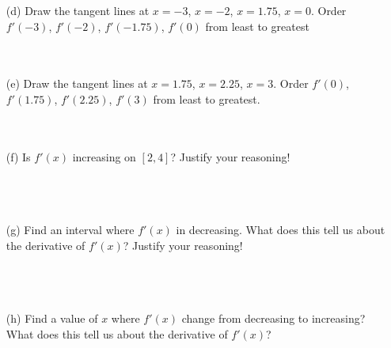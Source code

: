 \documentclass[12pt]{article}
\begin{document}
\begin{itemize}
\item[(d)] Draw the tangent lines at $x=-3$, $x=-2$, $x=1.75$, $x=0$. Order $f'(-3)$, $f'(-2)$, $f'(-1.75)$, $f'(0)$ from least to greatest\\\\\\
\item[(e)] Draw the tangent lines at $x=1.75$, $x=2.25$, $x=3$. Order $f'(0)$, $f'(1.75)$, $f'(2.25)$, $f'(3)$ from least to greatest.\\\\\\
\item[(f)] Is $f'(x)$ increasing on $[2,4]$? Justify your reasoning!\\\\\\\\
\item[(g)] Find an interval where $f'(x)$ in decreasing. What does this tell us about the derivative of $f'(x)$? Justify your reasoning!\\\\\\\\
\item[(h)] Find a value of $x$ where $f'(x)$ change from decreasing to increasing? What does this tell us about the derivative of $f'(x)$?
\end{itemize}
\newpage
\end{document}
